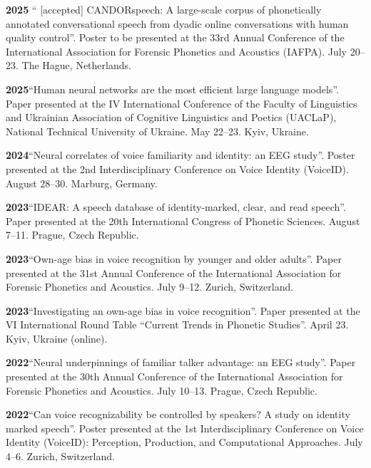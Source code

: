 \documentclass[11pt]{article}
\newcommand{\hangpara}{
 \setlength{\parindent}{0in} %
 \hangindent=0.42in %
}
\begin{document}
\vskip 6pt
\hangpara
{\bf 2025}\hspace{1ex} “ [accepted] CANDORspeech: A large-scale corpus of phonetically annotated conversational speech from dyadic online conversations with human quality control”. Poster to be presented at the 33rd Annual Conference of the International Association for Forensic Phonetics and Acoustics (IAFPA). July 20--23. The Hague, Netherlands.

\vskip 6pt
\hangpara
{\bf 2025}\hspace{1ex}“Human neural networks are the most efficient large language models”. Paper presented at the IV International Conference of the Faculty of Linguistics and Ukrainian Association of Cognitive Linguistics and Poetics (UACLaP), National Technical University of Ukraine. May 22--23. Kyiv, Ukraine.


\vskip 6pt
\hangpara
{\bf 2024}\hspace{1ex}“Neural correlates of voice familiarity and identity: an EEG study”. Poster presented at the 2nd Interdisciplinary Conference on Voice Identity (VoiceID). August 28--30. Marburg, Germany.


\vskip 6pt
\hangpara
{\bf 2023}\hspace{1ex}“IDEAR: A speech database of identity-marked, clear, and read speech”. Paper presented at the 20th International Congress of Phonetic Sciences. August 7--11. Prague, Czech Republic.


\vskip 6pt
\hangpara
{\bf 2023}\hspace{1ex}“Own-age bias in voice recognition by younger and older adults”. Paper presented at the 31st Annual Conference of the International Association for Forensic Phonetics and Acoustics. July 9--12. Zurich, Switzerland.


\vskip 6pt
\hangpara
{\bf 2023}\hspace{1ex}“Investigating an own-age bias in voice recognition”. Paper presented at the VI International Round Table “Current Trends in Phonetic Studies”. April 23. Kyiv, Ukraine (online).


\vskip 6pt
\hangpara
{\bf 2022}\hspace{1ex}“Neural underpinnings of familiar talker advantage: an EEG study”. Paper presented at the 30th Annual Conference of the International Association for Forensic Phonetics and Acoustics. July 10--13. Prague, Czech Republic.


\vskip 6pt
\hangpara
{\bf 2022}\hspace{1ex}“Can voice recognizability be controlled by speakers? A study on identity marked speech”. Poster presented at the 1st Interdisciplinary Conference on Voice Identity (VoiceID): Perception, Production, and Computational Approaches. July 4--6. Zurich, Switzerland.
\end{document}
